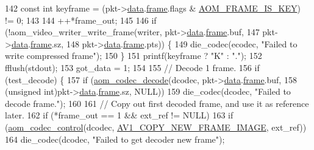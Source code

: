 \begin{DoxyCodeInclude}
{{{{{142       \textcolor{keyword}{const} \textcolor{keywordtype}{int} keyframe = (pkt->\hyperlink{structaom__codec__cx__pkt_afb379cd4bfa7692d1d6e85f4e4b2b410}{data}.\hyperlink{structaom__codec__cx__pkt_a4180a6ae59b0d295bc915d4689df4cb0}{frame}.flags & \hyperlink{group__encoder_gaf4a58f123913a5eef0a3796f0619e5f3}{AOM\_FRAME\_IS\_KEY}) != 0;
143 
144       ++*frame\_out;
145 
146       \textcolor{keywordflow}{if} (!aom\_video\_writer\_write\_frame(writer, pkt->\hyperlink{structaom__codec__cx__pkt_afb379cd4bfa7692d1d6e85f4e4b2b410}{data}.\hyperlink{structaom__codec__cx__pkt_a4180a6ae59b0d295bc915d4689df4cb0}{frame}.buf,
147                                         pkt->\hyperlink{structaom__codec__cx__pkt_afb379cd4bfa7692d1d6e85f4e4b2b410}{data}.\hyperlink{structaom__codec__cx__pkt_a4180a6ae59b0d295bc915d4689df4cb0}{frame}.sz,
148                                         pkt->\hyperlink{structaom__codec__cx__pkt_afb379cd4bfa7692d1d6e85f4e4b2b410}{data}.\hyperlink{structaom__codec__cx__pkt_a4180a6ae59b0d295bc915d4689df4cb0}{frame}.pts)) \{
149         die\_codec(ecodec, \textcolor{stringliteral}{"Failed to write compressed frame"});
150       \}
151       printf(keyframe ? \textcolor{stringliteral}{"K"} : \textcolor{stringliteral}{"."});
152       fflush(stdout);
153       got\_data = 1;
154 
155       \textcolor{comment}{// Decode 1 frame.}
156       \textcolor{keywordflow}{if} (test\_decode) \{
157         \textcolor{keywordflow}{if} (\hyperlink{group__decoder_gab03fdb999d1f83a5896869a3ba5f68f7}{aom\_codec\_decode}(dcodec, pkt->\hyperlink{structaom__codec__cx__pkt_afb379cd4bfa7692d1d6e85f4e4b2b410}{data}.\hyperlink{structaom__codec__cx__pkt_a4180a6ae59b0d295bc915d4689df4cb0}{frame}.buf,
158                              (\textcolor{keywordtype}{unsigned} \textcolor{keywordtype}{int})pkt->\hyperlink{structaom__codec__cx__pkt_afb379cd4bfa7692d1d6e85f4e4b2b410}{data}.\hyperlink{structaom__codec__cx__pkt_a4180a6ae59b0d295bc915d4689df4cb0}{frame}.sz, NULL))
159           die\_codec(dcodec, \textcolor{stringliteral}{"Failed to decode frame."});
160 
161         \textcolor{comment}{// Copy out first decoded frame, and use it as reference later.}
162         \textcolor{keywordflow}{if} (*frame\_out == 1 && ext\_ref != NULL)
163           \textcolor{keywordflow}{if} (\hyperlink{group__codec_ga6da974f4eeaba1fa74106b28d0fe6ac5}{aom\_codec\_control}(dcodec, 
      \hyperlink{group__aom_gga9421a1fa78c0d9587ae5aa6c1cb3d659ae41763622ee33cd99e23ca8f78a3f8fa}{AV1\_COPY\_NEW\_FRAME\_IMAGE}, ext\_ref))
164             die\_codec(dcodec, \textcolor{stringliteral}{"Failed to get decoder new frame"});
}}}}}
\end{DoxyCodeInclude}
